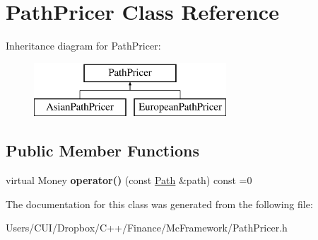\hypertarget{class_path_pricer}{}\section{Path\+Pricer Class Reference}
\label{class_path_pricer}
Inheritance diagram for Path\+Pricer\+:\begin{figure}[H]
\begin{center}
\leavevmode
\includegraphics[height=2.000000cm]{class_path_pricer}
\end{center}
\end{figure}
\subsection*{Public Member Functions}
\begin{DoxyCompactItemize}
\item 
\hypertarget{class_path_pricer_a057bf6a83f0cc2be06154144192ed918}{}\label{class_path_pricer_a057bf6a83f0cc2be06154144192ed918} 
virtual Money {\bfseries operator()} (const \hyperlink{class_path}{Path} \&path) const =0
\end{DoxyCompactItemize}


The documentation for this class was generated from the following file\+:\begin{DoxyCompactItemize}
\item 
Users/\+C\+U\+I/\+Dropbox/\+C++/\+Finance/\+Mc\+Framework/Path\+Pricer.\+h\end{DoxyCompactItemize}
